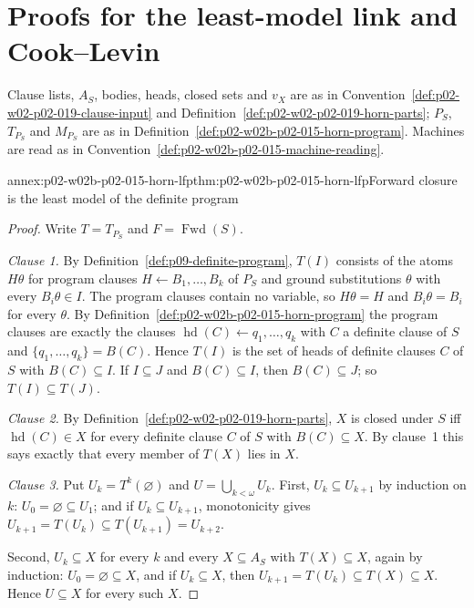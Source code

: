 \section{Proofs for the least-model link and Cook--Levin}
\label{sec:annex-p02-w02b-p02-015-links}

Clause lists, \(A_S\), bodies, heads, closed sets and \(v_X\) are as in
Convention~\ref{def:p02-w02-p02-019-clause-input} and
Definition~\ref{def:p02-w02-p02-019-horn-parts}; \(P_S\), \(T_{P_S}\) and
\(M_{P_S}\) are as in Definition~\ref{def:p02-w02b-p02-015-horn-program}.
Machines are read as in
Convention~\ref{def:p02-w02b-p02-015-machine-reading}.

\begin{annexitem}{annex:p02-w02b-p02-015-horn-lfp}{thm:p02-w02b-p02-015-horn-lfp}{Forward closure is the least model of the definite program}
\begin{proof}
Write \(T=T_{P_S}\) and \(F=\operatorname{Fwd}(S)\).

\emph{Clause 1.}  By Definition~\ref{def:p09-definite-program},
\(T(I)\) consists of the atoms \(H\theta\) for program clauses
\(H\leftarrow B_1,\ldots,B_k\) of \(P_S\) and ground substitutions \(\theta\)
with every \(B_i\theta\in I\).  The program clauses contain no variable, so
\(H\theta=H\) and \(B_i\theta=B_i\) for every \(\theta\).  By
Definition~\ref{def:p02-w02b-p02-015-horn-program} the program clauses are
exactly the clauses \(\operatorname{hd}(C)\leftarrow q_1,\ldots,q_k\) with
\(C\) a definite clause of \(S\) and \(\{q_1,\ldots,q_k\}=B(C)\).  Hence
\(T(I)\) is the set of heads of definite clauses \(C\) of \(S\) with
\(B(C)\subseteq I\).  If \(I\subseteq J\) and \(B(C)\subseteq I\), then
\(B(C)\subseteq J\); so \(T(I)\subseteq T(J)\).

\emph{Clause 2.}  By Definition~\ref{def:p02-w02-p02-019-horn-parts}, \(X\)
is closed under \(S\) iff \(\operatorname{hd}(C)\in X\) for every definite
clause \(C\) of \(S\) with \(B(C)\subseteq X\).  By clause~1 this says
exactly that every member of \(T(X)\) lies in \(X\).

\emph{Clause 3.}  Put \(U_k=T^k(\varnothing)\) and
\(U=\bigcup_{k<\omega}U_k\).  First, \(U_k\subseteq U_{k+1}\) by induction
on \(k\): \(U_0=\varnothing\subseteq U_1\); and if \(U_k\subseteq U_{k+1}\),
monotonicity gives \(U_{k+1}=T(U_k)\subseteq T(U_{k+1})=U_{k+2}\).

Second, \(U_k\subseteq X\) for every \(k\) and every \(X\subseteq A_S\) with
\(T(X)\subseteq X\), again by induction: \(U_0=\varnothing\subseteq X\), and
if \(U_k\subseteq X\), then \(U_{k+1}=T(U_k)\subseteq T(X)\subseteq X\).
Hence \(U\subseteq X\) for every such \(X\).


\end{proof}
\end{annexitem}
